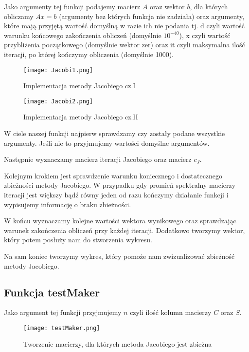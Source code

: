 \documentclass{article}
\begin{document}
Jako argumenty tej funkcji podajemy macierz \(A\) oraz wektor \(b\), dla których obliczamy \(Ax=b\) (argumenty bez których funkcja nie zadziała) oraz argumenty, które mają przyjętą wartość domyślną w razie ich nie podania tj. d czyli wartość warunku końcowego zakończenia obliczeń (domyślnie \(10^{-40}\)), x czyli wartość przybliżenia początkowego (domyślnie wektor zer) oraz it czyli maksymalna ilość iteracji, po której kończymy obliczenia (domyślnie 1000).

\begin{figure}[H]
  \caption{Implementacja metody Jacobiego cz.I}
  \centering
  \texttt{[image: Jacobi1.png]}
\end{figure}

\begin{figure}[H]
  \caption{Implementacja metody Jacobiego cz.II}
  \centering
  \texttt{[image: Jacobi2.png]}
\end{figure}

W ciele naszej funkcji najpierw sprawdzamy czy zostały podane wszystkie argumenty. Jeśli nie to przyjmujemy wartości domyślne argumentów.

Następnie wyznaczamy macierz iteracji Jacobiego oraz macierz \(c_J\).

Kolejnym krokiem jest sprawdzenie warunku koniecznego i dostatecznego zbieżności metody Jacobiego. W przypadku gdy promień spektralny macierzy iteracji jest większy bądź równy jeden od razu kończymy działanie funkcji i wypisujemy informację o braku zbieżności. 

W końcu wyznaczamy kolejne wartości wektora wynikowego oraz sprawdzając warunek zakończenia obliczeń przy każdej iteracji. Dodatkowo tworzymy wektor, który potem posłuży nam do stworzenia wykresu.

Na sam koniec tworzymy wykres, który pomoże nam zwizualizować zbieżność metody Jacobiego.

\subsection{Funkcja testMaker}

Jako argument tej funkcji przyjmujemy \(n\) czyli ilość kolumn macierzy \(C\) oraz \(S\).

\begin{figure}[H]
  \caption{Tworzenie macierzy, dla których metoda Jacobiego jest zbieżna}
  \centering
  \texttt{[image: testMaker.png]}
\end{figure}
\end{document}
